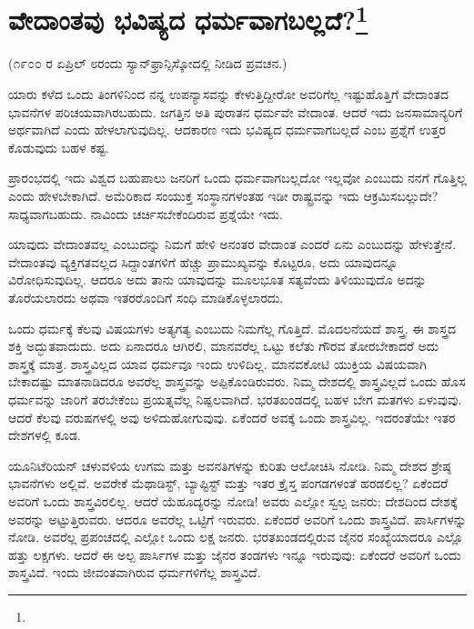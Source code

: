 
\chapter{ವೇದಾಂತವು ಭವಿಷ್ಯದ ಧರ್ಮವಾಗಬಲ್ಲದೆ?\protect\footnote{}}

\begin{center}
(೧೯೦೦ ರ ಏಪ್ರಿಲ್ ೮ರಂದು ಸ್ಯಾನ್‌ಫ್ರಾನ್ಸಿಸ್ಕೋದಲ್ಲಿ ನೀಡಿದ ಪ್ರವಚನ.)
\end{center}

ಯಾರು ಕಳೆದ ಒಂದು ತಿಂಗಳಿನಿಂದ ನನ್ನ ಉಪನ್ಯಾಸವನ್ನು ಕೇಳುತ್ತಿದ್ದೀರೋ ಅವರಿಗೆಲ್ಲ ಇಷ್ಟುಹೊತ್ತಿಗೆ ವೇದಾಂತದ ಭಾವನೆಗಳ ಪರಿಚಯವಾಗಿರಬಹುದು. ಜಗತ್ತಿನ ಅತಿ ಪುರಾತನ ಧರ್ಮವೇ ವೇದಾಂತ. ಆದರೆ ಇದು ಜನಸಾಮಾನ್ಯರಿಗೆ ಅರ್ಥವಾಗಿದೆ ಎಂದು ಹೇಳಲಾಗುವುದಿಲ್ಲ. ಆದಕಾರಣ ಇದು ಭವಿಷ್ಯದ ಧರ್ಮವಾಗಬಲ್ಲದೆ ಎಂಬ ಪ್ರಶ್ನೆಗೆ ಉತ್ತರ ಕೊಡುವುದು ಬಹಳ ಕಷ್ಟ.

ಪ್ರಾರಂಭದಲ್ಲಿ ಇದು ವಿಶ್ವದ ಬಹುಪಾಲು ಜನರಿಗೆ ಒಂದು ಧರ್ಮವಾಗಬಲ್ಲದೋ ಇಲ್ಲವೋ ಎಂಬುದು ನನಗೆ ಗೊತ್ತಿಲ್ಲ ಎಂದು ಹೇಳಬೇಕಾಗಿದೆ. ಅಮೆರಿಕಾದ ಸಂಯುಕ್ತ ಸಂಸ್ಥಾನಗಳಂತಹ ಇಡೀ ರಾಷ್ಟ್ರವನ್ನು ಇದು ಆಕ್ರಮಿಸಬಲ್ಲುದೇ? ಸಾಧ್ಯವಾಗಬಹುದು. ನಾವಿಂದು ಚರ್ಚಿಸಬೇಕೆಂದಿರುವ ಪ್ರಶ್ನೆಯೇ ಇದು.

ಯಾವುದು ವೇದಾಂತವಲ್ಲ ಎಂಬುದನ್ನು ನಿಮಗೆ ಹೇಳಿ ಅನಂತರ ವೇದಾಂತ ಎಂದರೆ ಏನು ಎಂಬುದನ್ನು ಹೇಳುತ್ತೇನೆ. ವೇದಾಂತವು ವ್ಯಕ್ತಿಗತವಲ್ಲದ ಸಿದ್ದಾಂತಗಳಿಗೆ ಹೆಚ್ಚು ಪ್ರಾಮುಖ್ಯವನ್ನು ಕೊಟ್ಟರೂ, ಅದು ಯಾವುದನ್ನೂ ವಿರೋಧಿಸುವುದಿಲ್ಲ. ಆದರೂ ಅದು ತಾನು ಯಾವುದನ್ನು ಮೂಲಭೂತ ಸತ್ಯವೆಂದು ತಿಳಿಯುವುದೊ ಅದನ್ನು ತೊರೆಯಲಾರದು ಅಥವಾ ಇತರರೊಂದಿಗೆ ಸಂಧಿ ಮಾಡಿಕೊಳ್ಳಲಾರದು.

ಒಂದು ಧರ್ಮಕ್ಕೆ ಕೆಲವು ವಿಷಯಗಳು ಅತ್ಯಗತ್ಯ ಎಂಬುದು ನಿಮಗೆಲ್ಲ ಗೊತ್ತಿದೆ. ಮೊದಲನೆಯದೆ ಶಾಸ್ತ್ರ. ಈ ಶಾಸ್ತ್ರದ ಶಕ್ತಿ ಅದ್ಭುತವಾದುದು. ಅದು ಏನಾದರೂ ಆಗಿರಲಿ, ಮಾನವರೆಲ್ಲ ಒಟ್ಟು ಕಲೆತು ಗೌರವ ತೋರಬೇಕಾದರೆ ಅದು ಶಾಸ್ತ್ರಕ್ಕೆ ಮಾತ್ರ. ಶಾಸ್ತ್ರವಿಲ್ಲದ ಯಾವ ಧರ್ಮವೂ ಇಂದು ಉಳಿದಿಲ್ಲ. ಮಾನವಕೋಟಿ ಯುಕ್ತಿಯ ವಿಷಯವಾಗಿ ಬೇಕಾದಷ್ಟು ಮಾತನಾಡಿದರೂ ಅವರೆಲ್ಲ ಶಾಸ್ತ್ರವನ್ನು ಅಪ್ಪಿಕೊಂಡಿರುವರು. ನಿಮ್ಮ ದೇಶದಲ್ಲಿ ಶಾಸ್ತ್ರವಿಲ್ಲದೆ ಒಂದು ಹೊಸ ಧರ್ಮವನ್ನು ಜಾರಿಗೆ ತರಬೇಕೆಂಬ ಪ್ರಯತ್ನವೆಲ್ಲ ನಿಷ್ಪಲವಾಗಿದೆ. ಭರತಖಂಡದಲ್ಲಿ ಬಹಳ ಬೇಗ ಮತಗಳು ಏಳುವುವು. ಆದರೆ ಕೆಲವು ವರುಷಗಳಲ್ಲಿ ಅವು ಅಳಿದುಹೋಗುವುವು. ಏಕೆಂದರೆ ಅವಕ್ಕೆ ಒಂದು ಶಾಸ್ತ್ರವಿಲ್ಲ. ಇದರಂತೆಯೇ ಇತರ ದೇಶಗಳಲ್ಲಿ ಕೂಡ.

ಯೂನಿಟೆರಿಯನ್ ಚಳುವಳಿಯ ಉಗಮ ಮತ್ತು ಅವನತಿಗಳನ್ನು ಕುರಿತು ಆಲೋಚಿಸಿ ನೋಡಿ. ನಿಮ್ಮ ದೇಶದ ಶ್ರೇಷ್ಠ ಭಾವನೆಗಳು ಅಲ್ಲಿವೆ. ಅವರೇಕೆ ಮೆಥಾಡಿಸ್ಟ್, ಬ್ಯಾಪ್ಟಿಸ್ಟ್ ಮತ್ತು ಇತರ ಕ್ರೈಸ್ತ ಪಂಗಡಗಳಂತೆ ಹರಡಲಿಲ್ಲ? ಏಕೆಂದರೆ ಅವರಿಗೆ ಒಂದು ಶಾಸ್ತ್ರವಿರಲಿಲ್ಲ. ಆದರೆ ಯೆಹೂದ್ಯರನ್ನು ನೋಡಿ! ಅವರು ಎಲ್ಲೋ ಸ್ವಲ್ಪ ಜನರು; ದೇಶದಿಂದ ದೇಶಕ್ಕೆ ಅವರನ್ನು ಅಟ್ಟುತ್ತಿರುವರು. ಆದರೂ ಅವರೆಲ್ಲ ಒಟ್ಟಿಗೆ ಇರುವರು. ಏಕೆಂದರೆ ಅವರಿಗೆ ಒಂದು ಶಾಸ್ತ್ರವಿದೆ. ಪಾರ್ಸಿಗಳನ್ನು ನೋಡಿ. ಅವರೆಲ್ಲ ಪ್ರಪಂಚದಲ್ಲಿ ಎಲ್ಲೋ ಒಂದು ಲಕ್ಷ ಜನರು. ಭರತಖಂಡದಲ್ಲಿರುವ ಜೈನರ ಸಂಖ್ಯೆಯಾದರೂ ಎಲ್ಲೊ ಹತ್ತು ಲಕ್ಷಗಳು. ಆದರೆ ಈ ಅಲ್ಪ ಪಾರ್ಸಿಗಳ ಮತ್ತು ಜೈನರ ತಂಡಗಳು ಇನ್ನೂ ಇರುವುವು: ಏಕೆಂದರೆ ಅವರಿಗೆ ಒಂದು ಶಾಸ್ತ್ರವಿದೆ. ಇಂದು ಜೀವಂತವಾಗಿರುವ ಧರ್ಮಗಳಿಗೆಲ್ಲ ಶಾಸ್ತ್ರವಿದೆ.

